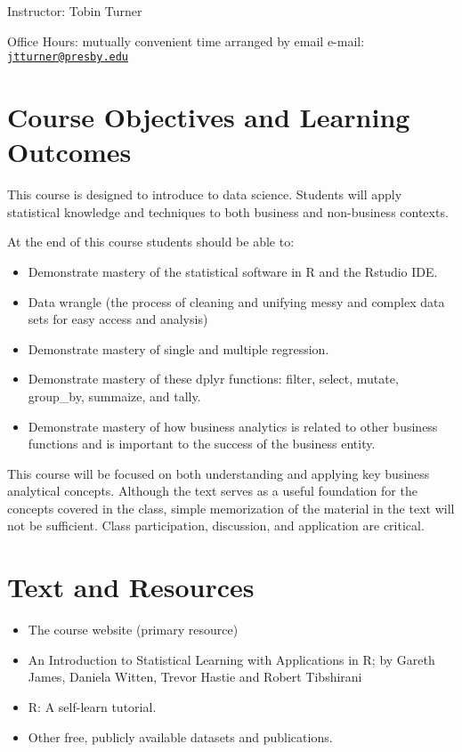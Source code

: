 \documentclass[
]{book}
\providecommand{\tightlist}{%
  \setlength{\itemsep}{0pt}\setlength{\parskip}{0pt}}
\begin{document}
Instructor: Tobin Turner

Office Hours: mutually convenient time arranged by email e-mail: \href{mailto:jtturner@presby.edu}{\nolinkurl{jtturner@presby.edu}}

\hypertarget{course-objectives-and-learning-outcomes}{%
\section{Course Objectives and Learning Outcomes}\label{course-objectives-and-learning-outcomes}}

This course is designed to introduce to data science. Students will apply statistical knowledge and techniques to both business and non-business contexts.

At the end of this course students should be able to:

\begin{itemize}
\tightlist
\item
  Demonstrate mastery of the statistical software in R and the Rstudio IDE.
\item
  Data wrangle (the process of cleaning and unifying messy and complex data sets for easy access and analysis)
\item
  Demonstrate mastery of single and multiple regression.
\item
  Demonstrate mastery of these dplyr functions: filter, select, mutate, group\_by, summaize, and tally.
\item
  Demonstrate mastery of how business analytics is related to other business functions and is important to the success of the business entity.
\end{itemize}

This course will be focused on both understanding and applying key business analytical concepts. Although the text serves as a useful foundation for the concepts covered in the class, simple memorization of the material in the text will not be sufficient. Class participation, discussion, and application are critical.

\hypertarget{text-and-resources}{%
\section{Text and Resources}\label{text-and-resources}}

\begin{itemize}
\tightlist
\item
  The course website (primary resource)
\item
  An Introduction to Statistical Learning with Applications in R; by Gareth James, Daniela Witten, Trevor Hastie and Robert Tibshirani
\item
  R: A self-learn tutorial.
\item
  Other free, publicly available datasets and publications.
\end{itemize}
\end{document}
